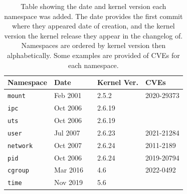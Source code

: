 \documentclass[sigplan]{acmart}
\begin{document}
\begin{table}
    \caption{Table showing the date and kernel version each namespace was added. The date provides the first commit where they appeared date of creation, and the kernel version the kernel release they appear in the changelog of. Namespaces are ordered by kernel version then alphabetically. Some examples are provided of CVEs for each namespace.}

    \begin{minipage}{\textwidth}
    \begin{center}
    \begin{tabular}{l|lr|lr|l}
        Namespace & \multicolumn{2}{l}{Date} & \multicolumn{2}{|l|}{Kernel Ver.} & CVEs \\ \hline

        \texttt{mount}
            & Feb 2001 & \citep{viro_patchcft_2001}
            & 2.5.2 & \citep{torvalds_linux_2002}
            & 2020-29373 \\

        \texttt{ipc}
            & Oct 2006 & \citep{korotaev_patch_2006}
            & 2.6.19 & \citep{noauthor_linux_2006}
            & \\

        \texttt{uts}
            & Oct 2006 & \citep{hallyn_patch_2006}
            & 2.6.19 & \citep{noauthor_linux_2006}
            & \\

        \texttt{user}
            & Jul 2007 & \citep{le_goater_user_2007}
            & 2.6.23 & \citep{noauthor_linux_2007}
            & 2021-21284 \\

        \texttt{network}
            & Oct 2007 & \citep{biederman_net_2007}
            & 2.6.24 & \citep{noauthor_linux_2008}
            & 2011-2189 \\

        \texttt{pid}
            & Oct 2006 & \citep{bhattiprolu_patch_2006}
            & 2.6.24 & \citep{noauthor_linux_2008}
            & 2019-20794 \\

        \texttt{cgroup}
            & Mar 2016 & \citep{heo_git_2016}
            & 4.6 & \citep{torvalds_linux_2016}
            & 2022-0492 \\

        \texttt{time}
            & Nov 2019 & \citep{vagin_ns_2020}
            & 5.6 & \citep{noauthor_linux_2020}
            &

    \end{tabular}
    \end{center}
    \end{minipage}
    
    \label{tab:namespaces}
\end{table}
\end{document}
